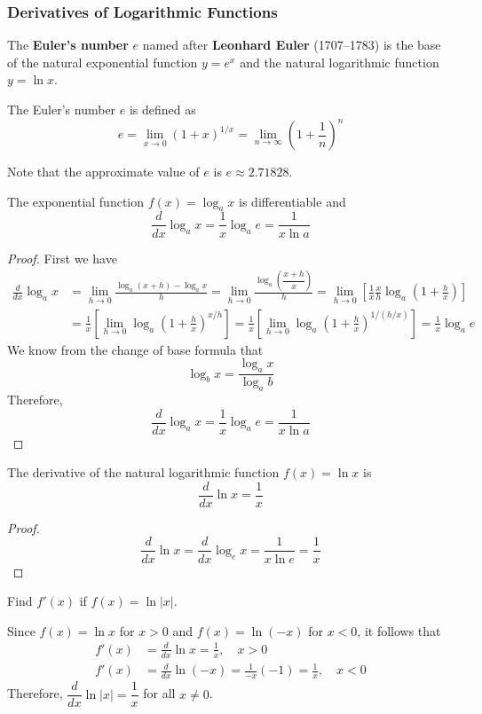 \subsubsection*{Derivatives of Logarithmic Functions}
The \textbf{Euler's number} \(e\) named after \textbf{Leonhard Euler} (1707--1783)
is the base of the natural exponential function \(y=e^x\) and the natural
logarithmic function \(y=\ln x\).
\begin{definition}
    The Euler's number \(e\) is defined as
    \[e=\lim_{x\to 0}(1+x)^{1/x}
    =\lim_{n\to\infty}\left(1+\frac{1}{n}\right)^n\]
\end{definition}
Note that the approximate value of \(e\) is \(e\approx2.71828\).
\begin{theorem}
    The exponential function \(f(x)=\log_a x\) is differentiable and
    \[\frac{d}{dx}\log_a x=\frac{1}{x}\log_a e=\frac{1}{x\ln a}\]
\end{theorem}
\begin{proof}
    First we have
    \begin{align*}
        \frac{d}{dx}\log_a x &= \lim_{h\to 0}\frac{\log_a(x+h)-\log_a x}{h}
        =\lim_{h\to 0}\frac{\log_a\left(\dfrac{x+h}{x}\right)}{h}
        =\lim_{h\to 0}\left[\frac{1}{x}\frac{x}{h}
        \log_a\left(1+\frac{h}{x}\right)\right] \\
        &= \frac{1}{x}\left[
            \lim_{h\to 0}\log_a\left(1+\frac{h}{x}\right)^{x/h}\right]
        =\frac{1}{x}\left[
            \lim_{h\to 0}\log_a\left(1+\frac{h}{x}\right)^{1/(h/x)}\right]
        =\frac{1}{x}\log_a e
    \end{align*}
    We know from the change of base formula that
    \[\log_b x=\frac{\log_a x}{\log_a b}\]
    Therefore,
    \[\frac{d}{dx}\log_a x=\frac{1}{x}\log_a e=\frac{1}{x\ln a}\]
\end{proof}
\begin{theorem}
    The derivative of the natural logarithmic function \(f(x)=\ln x\) is
    \[\frac{d}{dx}\ln x=\frac{1}{x}\]
\end{theorem}
\begin{proof}
    \[\frac{d}{dx}\ln x=\frac{d}{dx}\log_e x=\frac{1}{x\ln e}
    =\frac{1}{x}\]
\end{proof}
\begin{problem}
    Find \(f'(x)\) if \(f(x)=\ln|x|\).
\end{problem}
\begin{solution}
    Since \(f(x)=\ln x\) for \(x>0\) and \(f(x)=\ln(-x)\) for \(x<0\),
    it follows that
    \begin{align*}
        f'(x) &= \frac{d}{dx}\ln x=\frac{1}{x},\quad x>0 \\
        f'(x) &= \frac{d}{dx}\ln(-x)=\frac{1}{-x}(-1)=\frac{1}{x},\quad x<0
    \end{align*}
    Therefore, \(\dfrac{d}{dx}\ln|x|=\dfrac{1}{x}\) for all \(x\neq 0\).
\end{solution}


